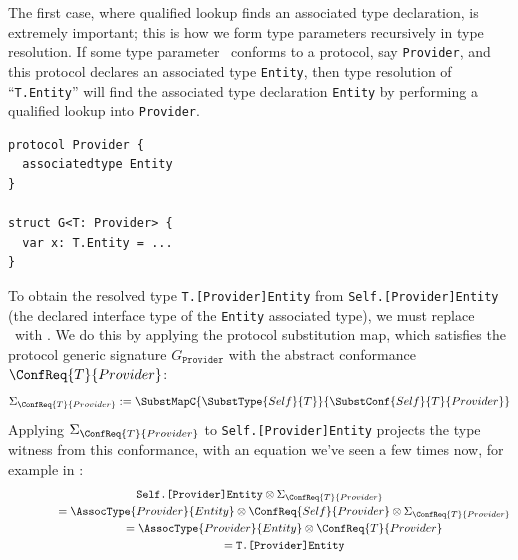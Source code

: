 \documentclass[../generics]{subfiles}
\begin{document}
The first case, where qualified lookup finds an associated type declaration, is extremely important; this is how we form type parameters recursively in type resolution. If some type parameter \tT\ conforms to a protocol, say \texttt{Provider}, and this protocol declares an associated type \texttt{Entity}, then type resolution of ``\texttt{T.Entity}'' will find the associated type declaration \texttt{Entity} by performing a qualified lookup into \texttt{Provider}.
\begin{Verbatim}
protocol Provider {
  associatedtype Entity
}

struct G<T: Provider> {
  var x: T.Entity = ...
}
\end{Verbatim}
To obtain the resolved type \texttt{T.[Provider]Entity} from \texttt{Self.[Provider]Entity} (the declared interface type of the \texttt{Entity} associated type), we must replace \tSelf\ with \tT. We do this by applying the protocol substitution map, which satisfies the protocol generic signature $G_\texttt{Provider}$ with the abstract conformance $\ConfReq{T}{Provider}$: \[\Sigma_{\ConfReq{T}{Provider}}:=\SubstMapC{\SubstType{Self}{T}}{\SubstConf{Self}{T}{Provider}}\]
Applying $\Sigma_{\ConfReq{T}{Provider}}$ to \texttt{Self.[Provider]Entity} projects the type witness from this conformance, with an equation we've seen a few times now, for example in :
\begin{gather*}
\texttt{Self.[Provider]Entity}\otimes\Sigma_{\ConfReq{T}{Provider}}\\
\qquad\qquad{}=\AssocType{Provider}{Entity}\otimes\ConfReq{Self}{Provider}\otimes\Sigma_{\ConfReq{T}{Provider}}\\
\qquad\qquad{}=\AssocType{Provider}{Entity}\otimes\ConfReq{T}{Provider}\\
\qquad\qquad{}=\texttt{T.[Provider]Entity}
\end{gather*}
\end{document}
